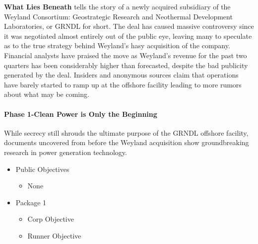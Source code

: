 \documentclass[titlepage]{article}
\begin{document}
				\textbf{What Lies Beneath} tells the story of a newly acquired subsidiary of the Weyland Consortium: Geostrategic Research and Neothermal Development Laboratories, or GRNDL for short. The deal has caused massive controversy since it was negotiated almost entirely out of the public eye, leaving many to speculate as to the true strategy behind Weyland's hasy acquisition of the company. Financial analysts have praised the move as Weyland's revenue for the past two quarters has been considerably higher than forecasted, despite the bad publicity generated by the deal. Insiders and anonymous sources claim that operations have barely started to ramp up at the offshore facility leading to more rumors about what may be coming.
				\paragraph{Phase 1-Clean Power is Only the Beginning}

				While secrecy still shrouds the ultimate purpose of the GRNDL offshore facility, documents uncovered from before the Weyland acquisition show groundbreaking research in power generation technology.
				\begin{itemize}
					\item Public Objectives
						\begin{itemize}
							\item None
						\end{itemize}
					\item Package 1
						\begin{itemize}
							\item Corp Objective
							\item Runner Objective
						\end{itemize}
				\end{itemize}
\end{document}
